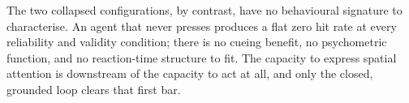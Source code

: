 The two collapsed configurations, by contrast, have no behavioural signature to characterise. An agent that never presses produces a flat zero hit rate at every reliability and validity condition; there is no cueing benefit, no psychometric function, and no reaction-time structure to fit. The capacity to express spatial attention is downstream of the capacity to act at all, and only the closed, grounded loop clears that first bar.
